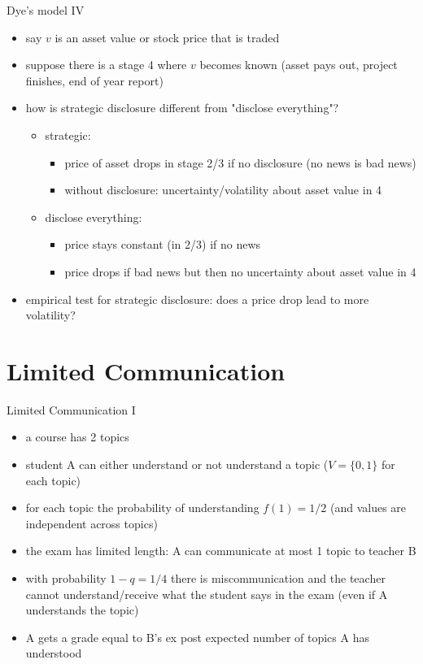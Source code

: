 \documentclass[bigger]{beamer}
\begin{document}
\begin{frame}[label={sec:orgheadline12}]{Dye's model IV}
\begin{itemize}
\item say \(v\) is an asset value or stock price that is traded
\item suppose there is a stage 4 where \(v\) becomes known (asset pays out, project finishes, end of year report)
\item how is strategic disclosure different from "disclose everything"?
\begin{itemize}
\item strategic:
\begin{itemize}
\item price of asset drops in stage 2/3 if no disclosure (no news is bad news)
\item without disclosure: uncertainty/volatility about asset value in 4
\end{itemize}
\item disclose everything:
\begin{itemize}
\item price stays constant (in 2/3) if no news
\item price drops if bad news but then no uncertainty about asset value in 4
\end{itemize}
\end{itemize}
\item empirical test for strategic disclosure: does a price drop lead to more volatility?
\end{itemize}
\end{frame}


\section{Limited Communication}
\label{sec:orgheadline16}

\begin{frame}[label={sec:orgheadline14}]{Limited Communication  I}
\begin{itemize}
\item a course has 2 topics
\item student A can either understand or not understand a topic (\(V=\{0,1\}\) for each topic)
\item for each topic the probability of understanding \(f(1)=1/2\) (and values are independent across topics)
\item the exam has limited length: A can communicate at most 1 topic to teacher B
\item with probability \(1-q=1/4\) there is miscommunication and the teacher cannot understand/receive what the student says in the exam (even if A understands the topic)
\item A gets a grade equal to B's ex post expected number of topics A has understood
\end{itemize}
\end{frame}
\end{document}
